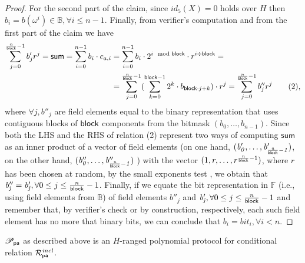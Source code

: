 \begin{proof}
\noindent For the second part of the claim, since $id_5(X) = 0$ holds over $H$ then 
$b_i = b(\omega^i) \in \mathbb{B}, \forall i \leq n-1$. Finally, from 
verifier's computation and from the first part of the claim we have 
\begin{align*}
\sum_{j=0}^{\frac{n}{\mathsf{block}}-1} b'_{j}r^j = \mathsf{sum} =  \sum_{i=0}^{n-1} b_i \cdot c_{a,i} & = \sum_{i=0}^{n-1} b_i \cdot 2^{i \mod {\mathsf{block}}} \cdot r^{i \div \mathsf{block}} = \\
&= \sum_{j=0}^{\frac{n}{\mathsf{block}} -1} (\sum_{k=0}^{\mathsf{block} -1} 2^k \cdot b_{\mathsf{block}\cdot j +k}) \cdot r^j = \sum_{j=0}^{\frac{n}{\mathsf{block}} -1} b''_{j}r^j \tag{2},
\end{align*}
where $\forall j, b''_{j}$ are field elements equal to the binary representation that uses contiguous blocks 
of $\mathsf{block}$ components from the bitmask $(\mathit{b}_0, \ldots, \mathit{b}_{n-1})$.
Since both the LHS and the RHS of relation (2) represent two ways of computing $\mathsf{sum}$ as an inner product of a vector 
of field elements (on one hand, $(\mathit{b'_{0}}, \ldots, \mathit{b'_{\frac{n}{\mathsf{block}}-1}})$, on the other hand, 
$(\mathit{b''_{0}}, \ldots, \mathit{b''_{\frac{n}{\mathsf{block}}-1}})$ ) with the vector $(1, r, \ldots, r^{\frac{n}{\mathsf{block}}-1})$, 
where $r$ has been chosen at random, by the small exponents test \cite{small_exponents}, we obtain that \ewnp 
$\mathit{b''_{j}} = \mathit{b'_{j}}, \forall 0\leq j\leq \frac{n}{\mathsf{block}}-1$. Finally, if we equate the bit representation in $\mathbb{F}$ 
(i.e., using field elements from $\mathbb{B}$) of field elements $\mathit{b''_{j}}$ and $\mathit{b'_{j}}, \forall 0\leq j\leq \frac{n}{\mathsf{block}}-1$ and remember that, 
by verifier's check or by construction, respectively, each such field element has no more that \block binary bits, we can conclude that \ewnp 
$b_i = \mathit{bit_i}, \forall i <n$.
\end{proof}

\begin{lemma} 
$\mathscr{P}_{\mathsf{pa}}$ as described above is an $H$-ranged polynomial protocol for conditional relation $\mathcal{R}^{\mathit{incl}}_{\mathsf{pa}}$.
\end{lemma}

